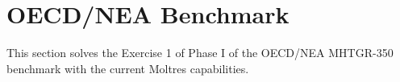 \section{OECD/NEA Benchmark}

This section solves the Exercise 1 of Phase I of the OECD/NEA MHTGR-350 benchmark with the current Moltres capabilities.